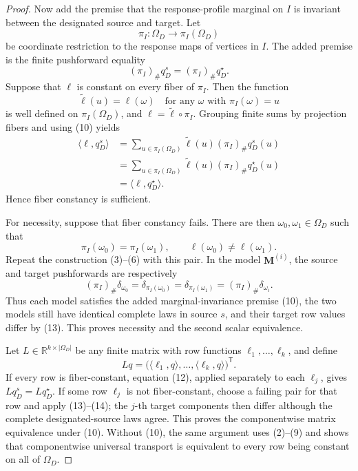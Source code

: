 \documentclass{article}
\begin{document}
\begin{proof}
Now add the premise that the response-profile marginal on \(I\) is invariant between the designated source and target.  Let
\[
\pi_I:\Omega_D\longrightarrow\pi_I(\Omega_D)
\]
be coordinate restriction to the response maps of vertices in \(I\).  The added premise is the finite pushforward equality
\[
(\pi_I)_{\#}q_D^s=(\pi_I)_{\#}q_D^\star.
\tag{10}
\]
Suppose that \(\ell\) is constant on every fiber of \(\pi_I\).  Then the function
\[
\widetilde\ell(u)=\ell(\omega)
\quad\text{for any }\omega\text{ with }\pi_I(\omega)=u
\tag{11}
\]
is well defined on \(\pi_I(\Omega_D)\), and \(\ell=\widetilde\ell\circ\pi_I\).  Grouping finite sums by projection fibers and using (10) yields
\[
\begin{aligned}
\langle\ell,q_D^s\rangle
&=\sum_{u\in\pi_I(\Omega_D)}
  \widetilde\ell(u)(\pi_I)_{\#}q_D^s(u)\\
&=\sum_{u\in\pi_I(\Omega_D)}
  \widetilde\ell(u)(\pi_I)_{\#}q_D^\star(u)\\
&=\langle\ell,q_D^\star\rangle.
\end{aligned}
\tag{12}
\]
Hence fiber constancy is sufficient.

For necessity, suppose that fiber constancy fails.  There are then \(\omega_0,\omega_1\in\Omega_D\) such that
\[
\pi_I(\omega_0)=\pi_I(\omega_1),
\qquad
\ell(\omega_0)\ne\ell(\omega_1).
\tag{13}
\]
Repeat the construction (3)--(6) with this pair.  In the model \(\mathbf M^{(i)}\), the source and target pushforwards are respectively
\[
(\pi_I)_{\#}\delta_{\omega_0}
=\delta_{\pi_I(\omega_0)}
=\delta_{\pi_I(\omega_1)}
=(\pi_I)_{\#}\delta_{\omega_i}.
\tag{14}
\]
Thus each model satisfies the added marginal-invariance premise (10), the two models still have identical complete laws in source \(s\), and their target row values differ by (13).  This proves necessity and the second scalar equivalence.

Let \(L\in\mathbb R^{k\times|\Omega_D|}\) be any finite matrix with row functions \(\ell_1,\ldots,\ell_k\), and define
\[
Lq=
\bigl(\langle\ell_1,q\rangle,\ldots,
      \langle\ell_k,q\rangle\bigr)^{\mathsf T}.
\tag{15}
\]
If every row is fiber-constant, equation (12), applied separately to each \(\ell_j\), gives \(Lq_D^s=Lq_D^\star\).  If some row \(\ell_j\) is not fiber-constant, choose a failing pair for that row and apply (13)--(14); the \(j\)-th target components then differ although the complete designated-source laws agree.  This proves the componentwise matrix equivalence under (10).  Without (10), the same argument uses (2)--(9) and shows that componentwise universal transport is equivalent to every row being constant on all of \(\Omega_D\).


\end{proof}
\end{document}

